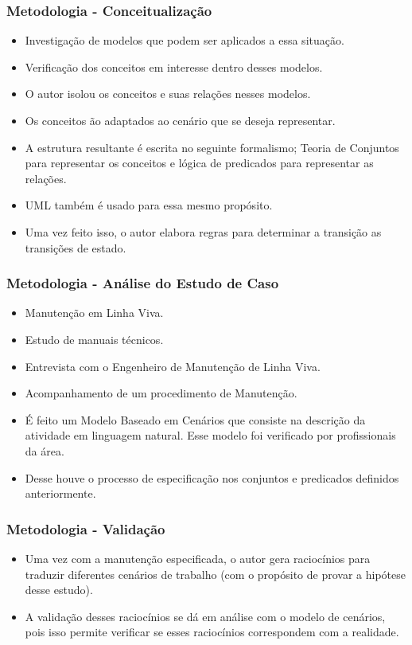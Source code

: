 \documentclass{beamer}
\begin{document}
\begin{frame}
	\frametitle{Metodologia - Conceitualização}
	\begin{itemize}
		\item Investigação de modelos que podem ser aplicados a essa situação.
		\item Verificação dos conceitos em interesse dentro desses modelos. 
		\item O autor isolou os conceitos e suas relações nesses modelos. 
		\item Os conceitos ão adaptados ao cenário que se deseja representar.
		\item A estrutura resultante é escrita no seguinte formalismo; Teoria de Conjuntos para representar os conceitos e lógica de predicados para representar as relações. 
		\item UML também é usado para essa mesmo propósito. 
		\item Uma vez feito isso, o autor elabora regras para determinar a transição as transições de estado.
	\end{itemize} 
\end{frame}

\begin{frame}
	\frametitle{Metodologia - Análise do Estudo de Caso}
	\begin{itemize}
		\item Manutenção em Linha Viva. 
		\item Estudo de manuais técnicos. 
		\item Entrevista com o Engenheiro de Manutenção de Linha Viva. 
		\item Acompanhamento de um procedimento de Manutenção. 
		\item É feito um Modelo Baseado em Cenários que consiste na descrição da atividade em linguagem natural. Esse modelo foi verificado por profissionais da área. 
		\item Desse houve o processo de especificação nos conjuntos e predicados definidos anteriormente. 
	\end{itemize} 
\end{frame}

\begin{frame}
	\frametitle{Metodologia - Validação}
	\begin{itemize}
		\item Uma vez com a manutenção especificada, o autor gera raciocínios para traduzir diferentes cenários de trabalho (com o propósito de provar a hipótese desse estudo). 
		\item A validação desses raciocínios se dá em análise com o modelo de cenários, pois isso permite verificar se esses raciocínios correspondem com a realidade. 
	\end{itemize} 
\end{frame}
\end{document}
